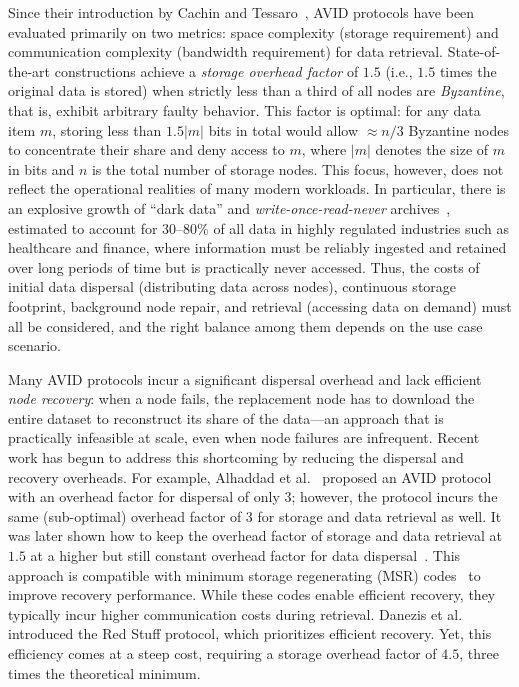 \documentclass[sigconf,screen]{acmart}
\begin{document}
Since their introduction by Cachin and Tessaro~\cite{cachin2005}, AVID protocols have been evaluated primarily on two metrics: space complexity (storage requirement) and communication complexity (bandwidth requirement) for data retrieval.
State-of-the-art constructions achieve a \emph{storage overhead factor} of $1.5$ (i.e., $1.5$ times the original data is stored) when strictly less than a third of all nodes are \emph{Byzantine}, that is, exhibit arbitrary faulty behavior. This factor is optimal: for any data item $m$, storing less than $1.5|m|$ bits in total would allow $\approx$$n/3$ Byzantine nodes to concentrate their share and deny access to $m$, where $|m|$ denotes the size of $m$ in bits and $n$ is the total number of storage nodes. 
This focus, however, does not reflect the operational realities of many modern workloads.
In particular, there is an explosive growth of ``dark data'' and \emph{write-once-read-never} archives~\cite{splunk2019, aaa2025}, estimated to account for 30--80\% of all data in highly regulated industries such as healthcare and finance, where information must be reliably ingested and retained over long periods of time but is practically never accessed.
Thus, the costs of initial data dispersal (distributing data across nodes), continuous storage footprint, background node repair, and retrieval (accessing data on demand) must all be considered, and the right balance among them depends on the use case scenario.

Many AVID protocols incur a significant dispersal overhead and lack efficient \emph{node recovery}: when a node fails, the replacement node has to download the entire dataset to reconstruct its share of the data---an approach that is practically infeasible at scale, even when node failures are infrequent.
Recent work has begun to address this shortcoming by reducing the dispersal and recovery overheads.
For example, Alhaddad et al.~\cite{alhaddad2022} proposed an AVID protocol with an overhead factor for dispersal of only $3$; however, the protocol incurs the same (sub-optimal) overhead factor of $3$ for storage and data retrieval as well.
It was later shown how to keep the overhead factor of storage and data retrieval at $1.5$ at a higher but still constant overhead factor for data dispersal~\cite{alhaddad2024}.  This approach is compatible with minimum storage regenerating (MSR) codes~\cite{dimakis2010} to improve recovery performance. While these codes enable efficient recovery, they typically incur higher communication costs during retrieval.
%
Danezis et al.~\cite{danezis2025} introduced the Red Stuff protocol, which prioritizes efficient recovery. %
Yet, this efficiency comes at a steep cost, requiring a storage overhead factor of $4.5$, three times the theoretical minimum.
\end{document}
